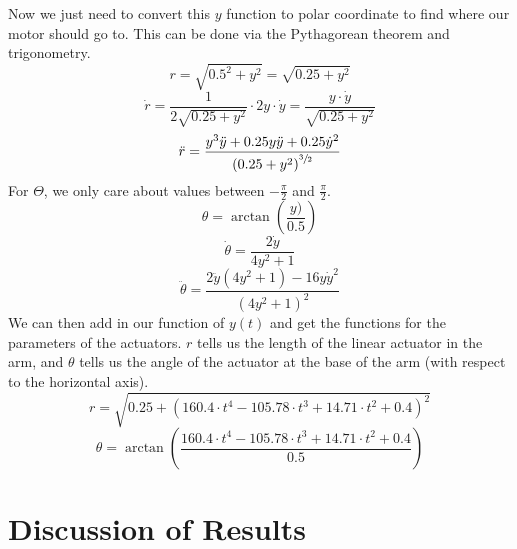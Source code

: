 \documentclass[nofoot,pdf-a,balance,colorlinks,upint,subscriptcorrection,varvw,mathalfa=cal=boondoxo]{asmeconf}
\begin{document}
	Now we just need to convert this $y$ function to polar coordinate to find where our motor should go to. This can be done via the Pythagorean theorem and trigonometry.
	\begin{equation}
        r = \sqrt{0.5^2+y^2} = \sqrt{0.25 + y^2}
	\end{equation}
	\begin{equation}
        \dot{r} = \frac{1}{2\sqrt{0.25+y^2}}\cdot2y\cdot\dot{y} = \frac{ y\cdot\dot{y}}{\sqrt{0.25+y^2}}
	\end{equation}
	\begin{equation}
        \ddot{r} = \frac{y^3 \ddot{y} + 0.25 y\ddot{y} + 0.25\dot{y}^2}{{\left(0.25 + y^2\right)}^{\sfrac{3}{2}}}
	\end{equation}
    For $\Theta$, we only care about values between $-\frac{\pi}{2}$ and $\frac{\pi}{2}$.
	\begin{equation}
        \theta = \arctan{\left(\frac{y)}{0.5}\right)}
	\end{equation}
	\begin{equation}
        \dot{\theta} = \frac{2\dot{y}}{4y^2 + 1}
	\end{equation}
	\begin{equation}
        \ddot{\theta} = \frac{2\ddot{y}\left(4y^2+1\right) - 16y\dot{y}^2}{{\left(4y^2 + 1\right)}^2}
	\end{equation}
    We can then add in our function of $y\left(t\right)$ and get the functions for the parameters of the actuators. $r$ tells us the length of the linear actuator in the arm, and $\theta$ tells us the angle of the actuator at the base of the arm (with respect to the horizontal axis). 
	\begin{equation}
	r = \sqrt{0.25+\left( 160.4 \cdot t^4 - 105.78 \cdot t^3 + 14.71 \cdot t^2 + 0.4\right)^2}
	\end{equation}
	\begin{equation}
        \theta = \arctan{\left(\frac{160.4 \cdot t^4 - 105.78 \cdot t^3 + 14.71 \cdot t^2 + 0.4}{0.5}\right)}
	\end{equation}

	\section*{Discussion of Results}

	
\end{document}
